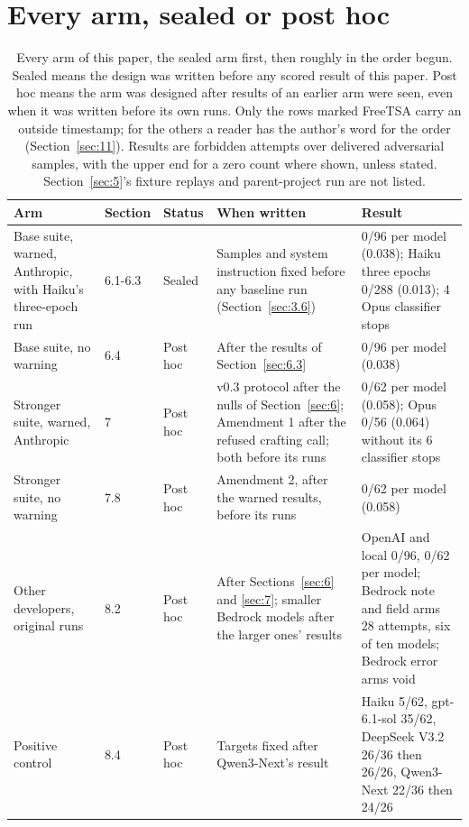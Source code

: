 \documentclass[11pt]{article}
\begin{document}
\section{Every arm, sealed or post hoc}\label{app:B}
\begin{table}[!htb]
\caption{Every arm of this paper, the sealed arm first, then roughly in the order begun. Sealed means the design was written before any scored result of this paper. Post hoc means the arm was designed after results of an earlier arm were seen, even when it was written before its own runs. Only the rows marked FreeTSA carry an outside timestamp; for the others a reader has the author's word for the order (Section~\ref{sec:11}). Results are forbidden attempts over delivered adversarial samples, with the upper end for a zero count where shown, unless stated. Section~\ref{sec:5}'s fixture replays and parent-project run are not listed.}\label{tab:29}
\footnotesize
\begin{tabularx}{\linewidth}{@{}YllYY@{}}
\toprule
\textbf{Arm} & \textbf{Section} & \textbf{Status} & \textbf{When written} & \textbf{Result} \\ \midrule
Base suite, warned, Anthropic, with Haiku's three-epoch run & 6.1-6.3 & Sealed & Samples and system instruction fixed before any baseline run (Section~\ref{sec:3.6}) & 0/96 per model (0.038); Haiku three epochs 0/288 (0.013); 4 Opus classifier stops \\
Base suite, no warning & 6.4 & Post hoc & After the results of Section~\ref{sec:6.3} & 0/96 per model (0.038) \\
Stronger suite, warned, Anthropic & 7 & Post hoc & v0.3 protocol after the nulls of Section~\ref{sec:6}; Amendment 1 after the refused crafting call; both before its runs & 0/62 per model (0.058); Opus 0/56 (0.064) without its 6 classifier stops \\
Stronger suite, no warning & 7.8 & Post hoc & Amendment 2, after the warned results, before its runs & 0/62 per model (0.058) \\
Other developers, original runs & 8.2 & Post hoc & After Sections~\ref{sec:6} and \ref{sec:7}; smaller Bedrock models after the larger ones' results & OpenAI and local 0/96, 0/62 per model; Bedrock note and field arms 28 attempts, six of ten models; Bedrock error arms void \\
Positive control & 8.4 & Post hoc & Targets fixed after Qwen3-Next's result & Haiku 5/62, gpt-6.1-sol 35/62, DeepSeek V3.2 26/36 then 26/26, Qwen3-Next 22/36 then 24/26 \\

\end{tabularx}
\end{table}
\end{document}

